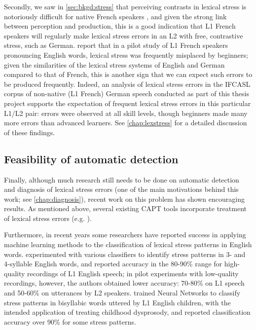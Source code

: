 Secondly, we saw in \cref{sec:bkgd:stress} that perceiving contrasts in lexical stress is notoriously difficult for native French speakers \citep{Cutler2005,Dupoux2008}, and given the strong link between perception and production,
this is a good indication that L1 French speakers will regularly make lexical stress errors in an L2 with free, contrastive stress, such as German. \textcite{Bonneau2011} report that in a pilot study of L1 French speakers pronouncing English words, lexical stress was frequently misplaced by beginners; given the similarities of the lexical stress systems of English and German compared to that of French, this is another sign that we can expect such errors to be produced frequently.
%
Indeed, an analysis of lexical stress errors in the IFCASL corpus of non-native (L1 French) German speech conducted as part of this thesis project supports the expectation of frequent lexical stress errors in this particular L1/L2 pair: 
errors were observed at all skill levels, though beginners made many more errors than advanced learners. See \cref{chap:lexstress} for a detailed discussion of these findings.
	

		\subsection{Feasibility of automatic detection}
		\label{sec:targeting:autodetect}

Finally, although much research still needs to be done on automatic detection and diagnosis of lexical stress errors (one of the main motivations behind this work; see \cref{chap:diagnosis}), recent work on this problem has shown encouraging results. As mentioned above, several existing CAPT tools incorporate treatment of lexical stress errors (e.g. \cite{Wik2009,Bonneau2011}). 

	Furthermore, in recent years some researchers have reported success in applying machine learning methods to the classification of lexical stress patterns in English words. 
		\textcite{Kim2011} experimented with various classifiers to identify  stress patterns in 3- and 4-syllable English words, and reported accuracy in the 80-90\% range for high-quality recordings of L1 English speech; in pilot experiments with low-quality recordings, however, the authors obtained lower accuracy: 70-80\% on L1 speech and 50-60\% on utterances by L2 speakers.
	\textcite{Shahin2012a} trained Neural Networks to classify stress patterns in bisyllabic words uttered by L1 English children, with the intended application of treating childhood dysprosody, and reported classification accuracy over 90\% for some stress patterns. 



